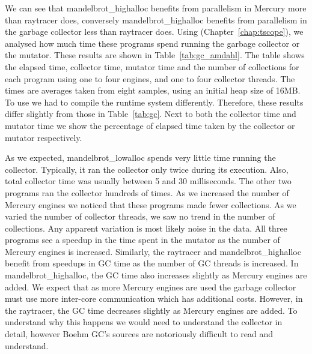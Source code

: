 

We can see that mandelbrot\_highalloc benefits from parallelism in Mercury
more than raytracer does,
conversely mandelbrot\_highalloc benefits from parallelism in the garbage
collector less than raytracer does.
Using \tscope (Chapter~\ref{chap:tscope}),
we analysed how much time these programs spend running the garbage collector
or the mutator.
These results are shown in Table~\ref{tab:gc_amdahl}.
The table shows the elapsed time, collector time, mutator time and the
number of collections for each program using one to four engines, and one
to four collector threads.
The times are averages taken from eight samples,
using an initial heap size of 16MB.
To use \tscope we had to compile the runtime system differently.
Therefore,
these results differ slightly from those in Table~\ref{tab:gc}.
Next to both the collector time and mutator time
we show the percentage of elapsed time taken by the collector or mutator
respectively.

As we expected, mandelbrot\_lowalloc spends very little time running the collector.
Typically, it ran the collector only twice during its execution.
Also, total collector time was usually between 5 and 30 milliseconds.
The other two programs ran the collector hundreds of times.
As we increased the number of Mercury engines
we noticed that these programs made fewer collections.
As we varied the number of collector threads,
we saw no trend in the number of collections.
Any apparent variation is most likely noise in the data.
All three programs see a speedup in the time spent in the mutator as the
number of Mercury engines is increased.
Similarly,
the raytracer and mandelbrot\_highalloc benefit from speedups
in GC time as the number of GC threads is increased.
In mandelbrot\_highalloc,
the GC time also increases slightly as Mercury engines are added.
We expect that as more Mercury engines are used the garbage collector
must use more inter-core communication which has additional costs.
However, in the raytracer,
the GC time decreases slightly as Mercury engines are added.
To understand why this happens we would need to understand the collector in
detail,
however Boehm GC's sources are notoriously difficult to read and
understand.

